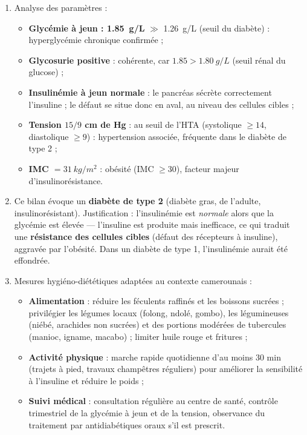 \documentclass[11pt]{article}
\begin{document}
\begin{corrige}
\begin{enumerate}
\item Analyse des paramètres :
\begin{itemize}
\item \textbf{Glycémie à jeun : \SI{1,85}{g/L}} $\gg$ \SI{1,26}{g/L} (seuil du diabète) : hyperglycémie chronique confirmée ;
\item \textbf{Glycosurie positive} : cohérente, car $\num{1,85} > \SI{1,80}{g/L}$ (seuil rénal du glucose) ;
\item \textbf{Insulinémie à jeun normale} : le pancréas sécrète correctement l'insuline ; le défaut se situe donc en aval, au niveau des cellules cibles ;
\item \textbf{Tension $15/9$ cm de Hg} : au seuil de l'HTA (systolique $\geq 14$, diastolique $\geq 9$) : hypertension associée, fréquente dans le diabète de type 2 ;
\item \textbf{IMC $= \SI{31}{kg/m^2}$} : obésité (IMC $\geq 30$), facteur majeur d'insulinorésistance.
\end{itemize}
\item Ce bilan évoque un \textbf{diabète de type 2} (diabète gras, de l'adulte, insulinorésistant). Justification : l'insulinémie est \emph{normale} alors que la glycémie est élevée — l'insuline est produite mais inefficace, ce qui traduit une \textbf{résistance des cellules cibles} (défaut des récepteurs à insuline), aggravée par l'obésité. Dans un diabète de type 1, l'insulinémie aurait été effondrée.
\item Mesures hygiéno-diététiques adaptées au contexte camerounais :
\begin{itemize}
\item \textbf{Alimentation} : réduire les féculents raffinés et les boissons sucrées ; privilégier les légumes locaux (folong, ndolé, gombo), les légumineuses (niébé, arachides non sucrées) et des portions modérées de tubercules (manioc, igname, macabo) ; limiter huile rouge et fritures ;
\item \textbf{Activité physique} : marche rapide quotidienne d'au moins 30 min (trajets à pied, travaux champêtres réguliers) pour améliorer la sensibilité à l'insuline et réduire le poids ;
\item \textbf{Suivi médical} : consultation régulière au centre de santé, contrôle trimestriel de la glycémie à jeun et de la tension, observance du traitement par antidiabétiques oraux s'il est prescrit.
\end{itemize}
\end{enumerate}
\end{corrige}
\end{document}

